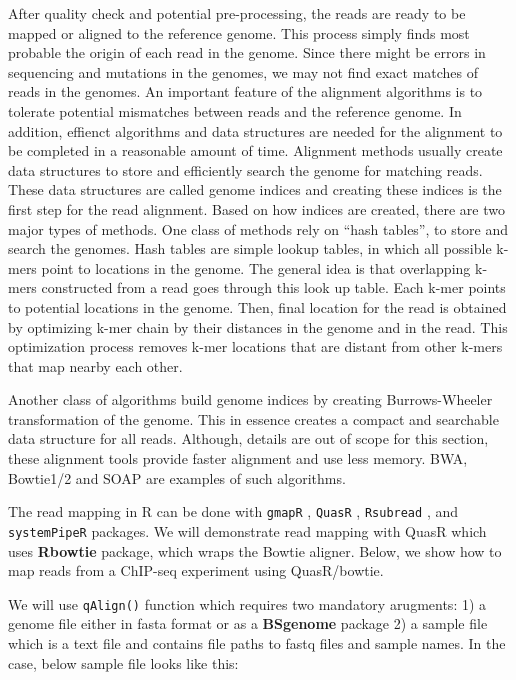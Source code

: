 \documentclass[12pt,]{krantz}
\begin{document}
After quality check and potential pre-processing, the reads are ready to be mapped or aligned to the reference genome. This process simply finds most probable the origin of each read in the genome. Since there might be errors in sequencing and mutations in the genomes, we may not find exact matches of reads in the genomes. An important feature of the alignment algorithms is to tolerate potential mismatches between reads and the reference genome. In addition, effienct algorithms and data structures are needed for the alignment to be completed in a reasonable amount of time. Alignment methods usually create data structures to store and efficiently search the genome for matching reads. These data structures are called genome indices and creating these indices is the first step for the read alignment. Based on how indices are created, there are two major types of methods. One class of methods rely on ``hash tables'', to store and search the genomes. Hash tables are simple lookup tables, in which all possible k-mers point to locations in the genome. The general idea is that overlapping k-mers constructed from a read goes through this look up table. Each k-mer points to potential locations in the genome. Then, final location for the read is obtained by optimizing k-mer chain by their distances in the genome and in the read. This optimization process removes k-mer locations that are distant from other k-mers that map nearby each other.

Another class of algorithms build genome indices by creating Burrows-Wheeler transformation of the genome. This in essence creates a compact and searchable data structure for all reads. Although, details are out of scope for this section, these alignment tools provide faster alignment and use less memory. BWA\citep{li2009fast}, Bowtie1/2\citep{langmead2012fast} and SOAP\citep{li2009soap2} are examples of such algorithms.

The read mapping in R can be done with \texttt{gmapR} \citep{gmapR}, \texttt{QuasR} \citep{gaidatzis_quasr:_2015}, \texttt{Rsubread} \citep{liao_subread_2013}, and \texttt{systemPipeR} \citep{backman_systempiper:_2016} packages. We will demonstrate read mapping with QuasR which uses \textbf{Rbowtie} package, which wraps the Bowtie aligner. Below, we show how to map reads from a ChIP-seq experiment using QuasR/bowtie.

We will use \texttt{qAlign()} function which requires two mandatory arugments: 1) a genome file either in fasta format or as a \textbf{BSgenome} package 2) a sample file which is a text file and contains file paths to fastq files and sample names. In the case, below sample file looks like this:
\end{document}
